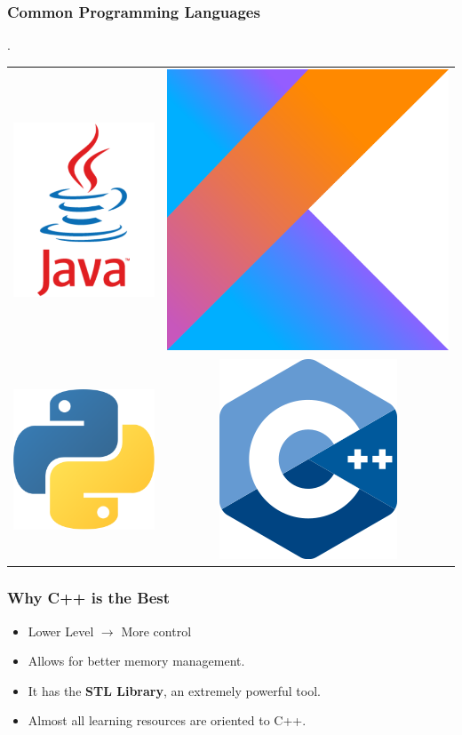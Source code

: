 \documentclass{beamer}
\begin{document}
\begin{frame}
	\frametitle{Common Programming Languages}

	\vspace{2mm}
	\begin{centering}
		\bgroup
		\def\arraystretch{5}
		\setlength\tabcolsep{35pt}.
		\begin{tabular}{ c c }
			\includegraphics[width=0.23\linewidth]{images/java} &
			\includegraphics[width=0.25\linewidth]{images/kotlin} \\
			\includegraphics[width=0.25\linewidth]{images/python} &
			\includegraphics[width=0.25\linewidth]{images/cpp}
		\end{tabular}
		\egroup
	\end{centering}
\end{frame}

\begin{frame}
	\frametitle{Why C++ is the Best}

	\begin{itemize}
		\item Lower Level $\rightarrow$ More control
		\item Allows for better memory management.
		\item It has the \textbf{STL Library}, an extremely powerful tool.
		\item Almost all learning resources are oriented to C++.
	\end{itemize}
\end{frame}
\end{document}
